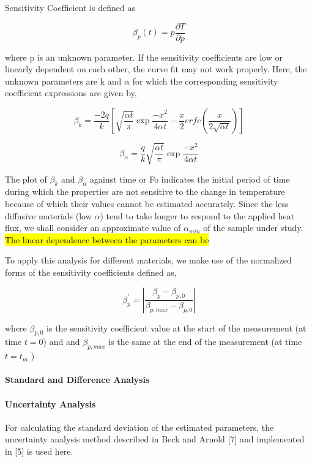 \documentclass[]{article}
\let\oldparagraph\paragraph
\renewcommand{\paragraph}[1]{\oldparagraph{#1}\mbox{}}
\begin{document}
 Sensitivity Coefficient is defined as

\[\beta_{p}(t) = p \frac{\partial T}{\partial p}\]

where p is an unknown parameter. If the sensitivity coefficients are low
or linearly dependent on each other, the curve fit may not work
properly. Here, the unknown parameters are k and \(\alpha\) for which
the corresponding sensitivity coefficient expressions are given by,

\[\beta_{k} =\frac{-2q}{k} \left[ \sqrt{\frac{\alpha t}{\pi}}\exp{\frac{-x^2}{4 \alpha t}} - \frac{x}{2}erfc(\frac{x}{2 \sqrt{\alpha t}})\right]\]

\[\beta_{\alpha} = \frac{q}{k}\sqrt{\frac{\alpha t}{\pi}}\exp{\frac{-x^2}{4 \alpha t}}\]

The plot of \(\beta_{k}\) and \(\beta_{\alpha}\) against time or Fo
indicates the initial period of time during which the properties are not
sensitive to the change in temperature because of which their values
cannot be estimated accurately. Since the less diffusive materials (low
\(\alpha\)) tend to take longer to respond to the applied heat flux, we
shall consider an approximate value of \(\alpha_{min}\) of the sample
under study. \hl{The linear dependence between the parameters can be}

To apply this analysis for different materials, we make use of the
normalized forms of the sensitivity coefficients defined as,

\[\beta_p^{'} =\left|\frac{\beta_p - \beta_{p,0}}{\beta_{p,max} - \beta_{p,0}}\right|\]

 where \(\beta_{p,0}\) is the sensitivity coefficient value at the start
of the measurement (at time \(t = 0\)) and and \(\beta_{p,max}\) is the
same at the end of the measurement (at time \(t=t_m\) )

\hypertarget{header-n41}{%
\paragraph{Standard and Difference Analysis}\label{header-n41}}

\hypertarget{header-n44}{%
\paragraph{Uncertainty Analysis}\label{header-n44}}

 For calculating the standard deviation of the estimated parameters, the
uncertainty analysis method described in Beck and Arnold {[}7{]} and
implemented in {[}5{]} is used here.
\end{document}
